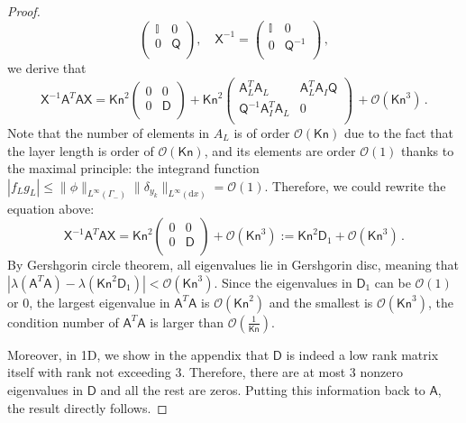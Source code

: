 \documentclass[english,reqno]{amsart}
\theoremstyle{plain}
\theoremstyle{definition} %
\newcommand{\Amat}{\mathsf{A}}
\newcommand{\Dmat}{\mathsf{D}}
\newcommand{\Xmat}{\mathsf{X}}
\newcommand{\Qmat}{\mathsf{Q}}
\newcommand{\rd}{\mathrm{d}}
\newcommand{\Kn}{\mathsf{Kn}}
\begin{document}
\begin{proof}
\[\begin{pmatrix}
\mathbb{I} & 0\\
0& \Qmat\\
\end{pmatrix}
,\quad
\Xmat^{-1}=
\begin{pmatrix}
\mathbb{I} & 0\\
0& \Qmat^{-1}\\
\end{pmatrix}\,,
\]
we derive that
\[
\Xmat^{-1}\Amat^{T}\Amat\Xmat= \Kn^2
\begin{pmatrix}
0& 0\\
0& \Dmat\\
\end{pmatrix}
+
\Kn^2\begin{pmatrix}
\Amat_L^T\Amat_L & \Amat^T_L\Amat_I\Qmat\\
\Qmat^{-1}\Amat_I^T\Amat_L & 0  \\
\end{pmatrix}\, + \mathcal{O}(\Kn^3)\,.
\]
Note that the number of elements in $A_L$ is of order $\mathcal{O}(\Kn)$ due to the fact that the layer length is order of $\mathcal{O}(\Kn)$, and its elements are order $\mathcal{O}(1)$ thanks to the maximal principle: the integrand function $|f_Lg_L|\leq \|\phi\|_{L^\infty(\Gamma_-)}\|\delta_{y_k}\|_{L^\infty(\rd{x})}=\mathcal{O}(1)$.
 Therefore, we could rewrite the equation above:
\[
\Xmat^{-1}\Amat^{T}\Amat\Xmat= \Kn^2
\begin{pmatrix}
0& 0\\
0& \Dmat\\
\end{pmatrix}
+\mathcal{O}(\Kn^3) := \Kn^2 \Dmat_1 + \mathcal{O}(\Kn^3)\,.
\]
By Gershgorin circle theorem, all eigenvalues lie in Gershgorin disc, meaning that $|\lambda(\Amat^T\Amat)-\lambda(\Kn^2 \Dmat_1)|<\mathcal{O}(\Kn^3)$. 
Since the eigenvalues in $\Dmat_1$ can be $\mathcal{O}(1)$ or 0, the largest eigenvalue in $\Amat^T\Amat$ is $\mathcal{O}(\Kn^2)$ and the smallest is $\mathcal{O}(\Kn^3)$, the condition number of $\Amat^T \Amat$ is larger than $\mathcal{O}\left( \frac{1}{\Kn}\right)$. 

Moreover, in 1D, we show in the appendix that $\Dmat$ is indeed a low rank matrix itself with rank not exceeding 3. Therefore, there are at most 3 nonzero eigenvalues in $\Dmat$ and all the rest are zeros. Putting this information back to $\Amat$, the result directly follows. 


\end{proof}
\end{document}
